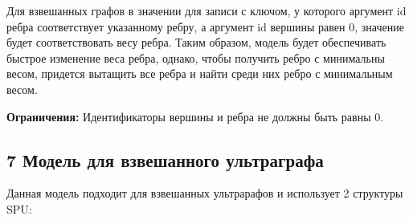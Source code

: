 \begin{DoxyEnumerate}
Для взвешанных графов в значении для записи с ключом, у которого аргумент {\ttfamily id ребра} соответствует указанному ребру, а аргумент {\ttfamily id вершины} равен 0, значение будет соответствовать весу ребра. Таким образом, модель будет обеспечивать быстрое изменение веса ребра, однако, чтобы получить ребро с минимальны весом, придется вытащить все ребра и найти среди них ребро с минимальным весом.
\end{DoxyEnumerate}

{\bfseries Ограничения\+:} Идентификаторы вершины и ребра не должны быть равны 0.\hypertarget{md_docs__xD0_x93_xD1_x80_xD0_xB0_xD1_x84_xD0_xBE_xD0_xB2_xD1_x8B_xD0_xB5__xD0_xBC_xD0_xBE_xD0_xB4_xD0_xB5_xD0_xBB_xD0_xB8_autotoc_md10}{}\subsection{7 Модель для взвешанного ультраграфа}\label{md_docs__xD0_x93_xD1_x80_xD0_xB0_xD1_x84_xD0_xBE_xD0_xB2_xD1_x8B_xD0_xB5__xD0_xBC_xD0_xBE_xD0_xB4_xD0_xB5_xD0_xBB_xD0_xB8_autotoc_md10}
Данная модель подходит для взвешанных ультрарафов и использует 2 структуры S\+PU\+:


